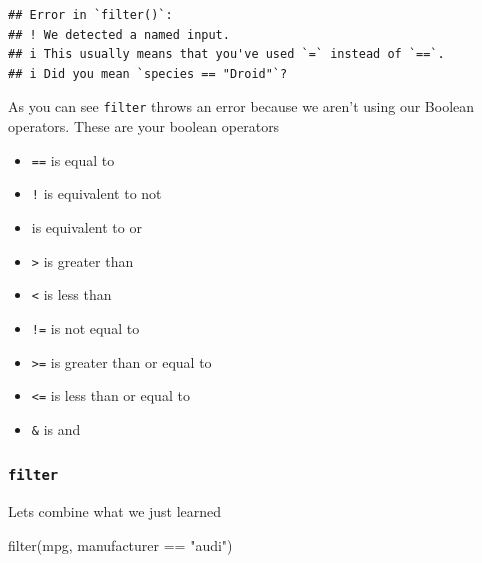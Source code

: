 \documentclass[]{tufte-handout}
\newenvironment{Shaded}{}{}
\newcommand{\FunctionTok}[1]{\textcolor[rgb]{0.02,0.16,0.49}{#1}}
\newcommand{\NormalTok}[1]{#1}
\newcommand{\SpecialCharTok}[1]{\textcolor[rgb]{0.25,0.44,0.63}{#1}}
\newcommand{\StringTok}[1]{\textcolor[rgb]{0.25,0.44,0.63}{#1}}
\providecommand{\tightlist}{%
  \setlength{\itemsep}{0pt}\setlength{\parskip}{0pt}}
\begin{document}
\begin{verbatim}
## Error in `filter()`:
## ! We detected a named input.
## i This usually means that you've used `=` instead of `==`.
## i Did you mean `species == "Droid"`?
\end{verbatim}

As you can see \texttt{filter} throws an error because we aren't using
our Boolean operators. These are your boolean operators

\begin{itemize}
\tightlist
\item
  \texttt{==} is equal to
\item
  \texttt{!} is equivalent to not
\item
  \texttt{\textbar{}} is equivalent to or
\item
  \texttt{\textgreater{}} is greater than
\item
  \texttt{\textless{}} is less than
\item
  \texttt{!=} is not equal to
\item
  \texttt{\textgreater{}=} is greater than or equal to
\item
  \texttt{\textless{}=} is less than or equal to
\item
  \texttt{\&} is and
\end{itemize}

\hypertarget{filter}{%
\subsubsection{\texorpdfstring{\texttt{filter}}{filter}}\label{filter}}

Lets combine what we just learned

\begin{Shaded}
\begin{Highlighting}[]
\FunctionTok{filter}\NormalTok{(mpg, manufacturer }\SpecialCharTok{==} \StringTok{"audi"}\NormalTok{)}
\end{Highlighting}
\end{Shaded}
\end{document}
